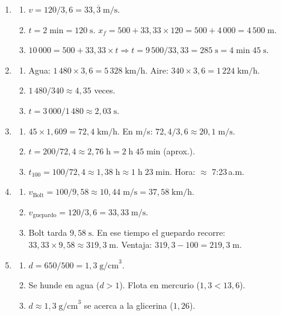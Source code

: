 \documentclass[12pt, letterpaper]{article}
\begin{document}
\begin{enumerate}[leftmargin=*, label=\textbf{\arabic*.}]
  \item \begin{enumerate}[label=\alph*)]
    \item $v = 120/3{,}6 = 33{,}\overline{3}\;\text{m/s}$.
    \item $t = 2\;\text{min} = 120\;\text{s}$. $x_f = 500 + 33{,}33 \times 120 = 500 + 4\,000 = 4\,500\;\text{m}$.
    \item $10\,000 = 500 + 33{,}33 \times t \Rightarrow t = 9\,500/33{,}33 = 285\;\text{s} = 4\;\text{min}\;45\;\text{s}$.
  \end{enumerate}

  \item \begin{enumerate}[label=\alph*)]
    \item Agua: $1\,480 \times 3{,}6 = 5\,328\;\text{km/h}$. Aire: $340 \times 3{,}6 = 1\,224\;\text{km/h}$.
    \item $1\,480/340 \approx 4{,}35$ veces.
    \item $t = 3\,000/1\,480 \approx 2{,}03\;\text{s}$.
  \end{enumerate}

  \item \begin{enumerate}[label=\alph*)]
    \item $45 \times 1{,}609 = 72{,}4\;\text{km/h}$. En m/s: $72{,}4/3{,}6 \approx 20{,}1\;\text{m/s}$.
    \item $t = 200/72{,}4 \approx 2{,}76\;\text{h} = 2\;\text{h}\;45\;\text{min}$ (aprox.).
    \item $t_{100} = 100/72{,}4 \approx 1{,}38\;\text{h} \approx 1\;\text{h}\;23\;\text{min}$. Hora: $\approx$ 7:23\,a.m.
  \end{enumerate}

  \item \begin{enumerate}[label=\alph*)]
    \item $v_{\text{Bolt}} = 100/9{,}58 \approx 10{,}44\;\text{m/s} = 37{,}58\;\text{km/h}$.
    \item $v_{\text{guepardo}} = 120/3{,}6 = 33{,}33\;\text{m/s}$.
    \item Bolt tarda $9{,}58\;\text{s}$. En ese tiempo el guepardo recorre: $33{,}33 \times 9{,}58 \approx 319{,}3\;\text{m}$. Ventaja: $319{,}3 - 100 = 219{,}3\;\text{m}$.
  \end{enumerate}

  \item \begin{enumerate}[label=\alph*)]
    \item $d = 650/500 = 1{,}3\;\text{g/cm}^3$.
    \item Se hunde en agua ($d > 1$). Flota en mercurio ($1{,}3 < 13{,}6$).
    \item $d \approx 1{,}3\;\text{g/cm}^3$ se acerca a la glicerina ($1{,}26$).
  \end{enumerate}


\end{enumerate}
\end{document}
